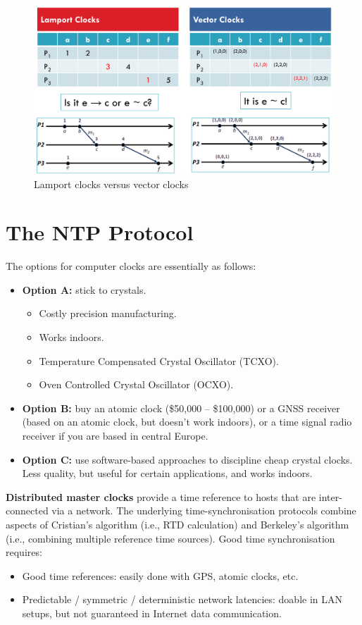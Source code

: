 \documentclass[a4paper,11pt]{article}
\begin{document}
\begin{figure}[H]
    \centering
    \includegraphics[width=\textwidth]{./images/vector_vs_lamport.png}
    \caption{Lamport clocks versus vector clocks}
\end{figure}

\section{The NTP Protocol}
The options for computer clocks are essentially as follows:
\begin{itemize}
    \item   \textbf{Option A:} stick to crystals.
            \begin{itemize}
                \item   Costly precision manufacturing.
                \item   Works indoors.
                \item   Temperature Compensated Crystal Oscillator (TCXO).
                \item   Oven Controlled Crystal Oscillator (OCXO).
            \end{itemize}

    \item   \textbf{Option B:} buy an atomic clock (\$50,000 -- \$100,000) or a GNSS receiver (based on an atomic clock, but doesn't work indoors), or a time signal radio receiver if you are based in central Europe.

    \item   \textbf{Option C:} use software-based approaches to discipline cheap crystal clocks.
            Less quality, but useful for certain applications, and works indoors.
\end{itemize}

\textbf{Distributed master clocks} provide a time reference to hosts that are inter-connected via a network.
The underlying time-synchronisation protocols combine aspects of Cristian's algorithm (i.e., RTD calculation) and Berkeley's algorithm (i.e., combining multiple reference time sources).
Good time synchronisation requires:
\begin{itemize}
    \item   Good time references: easily done with GPS, atomic clocks, etc.
    \item   Predictable / symmetric / deterministic network latencies: doable in LAN setups, but not guaranteed in Internet data communication.
\end{itemize}
\end{document}
